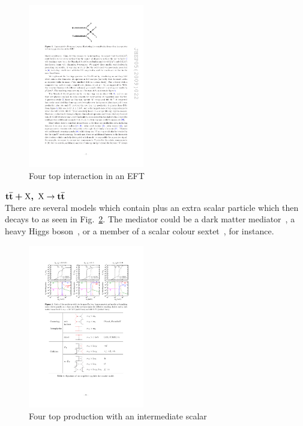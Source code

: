 \begin{figure}[ht!]
\centering
    \includegraphics[width=0.45\textwidth]{images/Theory/EFTTopComp.pdf}
    \caption{Four top interaction in an EFT~\cite{Tait2topcomp}}
    \label{fig:eft}
\end{figure}

$\boldsymbol{\mathrm{t}\overline{\mathrm{t}}+\textrm{X}, ~\textrm{X}}\rightarrow\boldsymbol{\mathrm{t}\overline{\mathrm{t}}}$\\
There are several models which contain \ttbar plus an extra scalar particle which then decays to \ttbar as seen in Fig.~\ref{fig:ttXtt}.
The mediator could be a dark matter mediator~\cite{Arina2016}, a heavy Higgs boson~\cite{Bernreuther:2015fts}, or a member of a scalar colour sextet~\cite{Cacciapaglia2015}, for instance. 

\begin{figure}[ht!]
\centering
    \includegraphics[width=0.45\textwidth]{images/Theory/ttDMtt.pdf}
    \caption{Four top production with an intermediate scalar~\cite{Arina2016}}
    \label{fig:ttXtt}
\end{figure}

